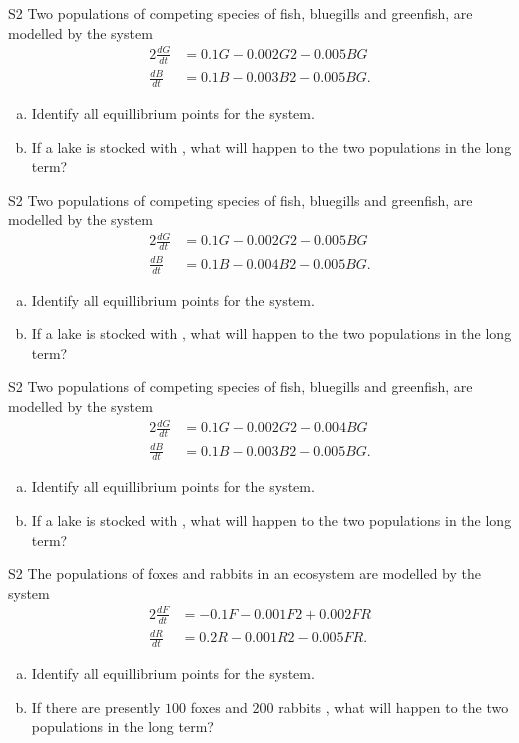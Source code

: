 \begin{problem}{S2}
Two populations of competing species of fish, bluegills and greenfish, are modelled by the system
\begin{alignat*}{2}
\frac{dG}{dt} &= 0.1G − 0.002G 2 − 0.005BG \\
\frac{dB}{dt} & = 0.1B − 0.003B 2 − 0.005BG.
\end{alignat*}
\begin{enumerate}[(a)]
\item Identify all equillibrium points for the system.
\item If a lake is stocked with , what will happen to the two populations in the long term?
\end{enumerate}
\end{problem}

\begin{problem}{S2}
Two populations of competing species of fish, bluegills and greenfish, are modelled by the system
\begin{alignat*}{2}
\frac{dG}{dt} &= 0.1G − 0.002G 2 − 0.005BG \\
\frac{dB}{dt} & = 0.1B − 0.004B 2 − 0.005BG.
\end{alignat*}
\begin{enumerate}[(a)]
\item Identify all equillibrium points for the system.
\item If a lake is stocked with , what will happen to the two populations in the long term?
\end{enumerate}
\end{problem}

\begin{problem}{S2}
Two populations of competing species of fish, bluegills and greenfish, are modelled by the system
\begin{alignat*}{2}
\frac{dG}{dt} &= 0.1G − 0.002G 2 − 0.004BG \\
\frac{dB}{dt} & = 0.1B − 0.003B 2 − 0.005BG.
\end{alignat*}
\begin{enumerate}[(a)]
\item Identify all equillibrium points for the system.
\item If a lake is stocked with , what will happen to the two populations in the long term?
\end{enumerate}
\end{problem}

\begin{problem}{S2}
The populations of foxes and rabbits in an ecosystem are modelled by the system
\begin{alignat*}{2}
\frac{dF}{dt} &= -0.1F − 0.001F 2 + 0.002FR \\
\frac{dR}{dt} & = 0.2R − 0.001R 2 − 0.005FR.
\end{alignat*}
\begin{enumerate}[(a)]
\item Identify all equillibrium points for the system.
\item If there are presently \(100\) foxes and \(200\) rabbits , what will happen to the two populations in the long term?
\end{enumerate}
\end{problem}

